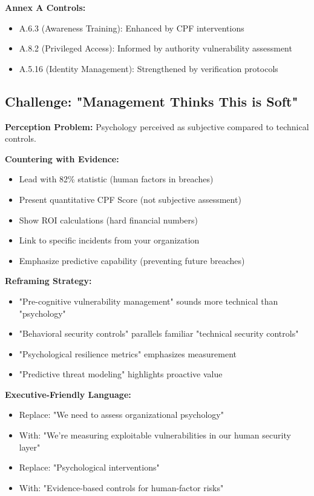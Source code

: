 \documentclass[11pt,a4paper]{article}
\begin{document}
\textbf{Annex A Controls:}
\begin{itemize}
\item A.6.3 (Awareness Training): Enhanced by CPF interventions
\item A.8.2 (Privileged Access): Informed by authority vulnerability assessment
\item A.5.16 (Identity Management): Strengthened by verification protocols
\end{itemize}

\subsection{Challenge: "Management Thinks This is Soft"}

\textbf{Perception Problem:} Psychology perceived as subjective compared to technical controls.

\textbf{Countering with Evidence:}
\begin{itemize}
\item Lead with 82\% statistic (human factors in breaches)
\item Present quantitative CPF Score (not subjective assessment)
\item Show ROI calculations (hard financial numbers)
\item Link to specific incidents from your organization
\item Emphasize predictive capability (preventing future breaches)
\end{itemize}

\textbf{Reframing Strategy:}
\begin{itemize}
\item "Pre-cognitive vulnerability management" sounds more technical than "psychology"
\item "Behavioral security controls" parallels familiar "technical security controls"
\item "Psychological resilience metrics" emphasizes measurement
\item "Predictive threat modeling" highlights proactive value
\end{itemize}

\textbf{Executive-Friendly Language:}
\begin{itemize}
\item Replace: "We need to assess organizational psychology"
\item With: "We're measuring exploitable vulnerabilities in our human security layer"
\item Replace: "Psychological interventions"
\item With: "Evidence-based controls for human-factor risks"
\end{itemize}
\end{document}
